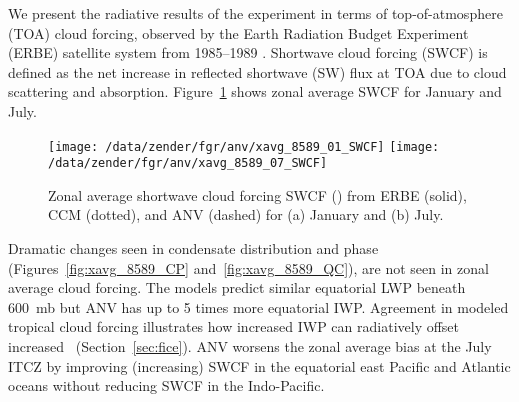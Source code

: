 \documentclass[twoside,agupp]{aguplus}
\begin{document}
We present the radiative results of the experiment in terms of
top-of-atmosphere (TOA) cloud forcing, observed by the Earth Radiation
Budget Experiment (ERBE) satellite system from 1985--1989
\cite[]{HuC92}.
Shortwave cloud forcing (SWCF) is defined as the net increase in
reflected shortwave (SW) flux at TOA due to cloud scattering and
absorption. 
Figure~\ref{fig:xavg_8589_SWCF} shows zonal average SWCF for January
and July. 
\begin{figure}
\begin{center}
\texttt{[image: /data/zender/fgr/anv/xavg\_8589\_01\_SWCF]}\vfill
\texttt{[image: /data/zender/fgr/anv/xavg\_8589\_07\_SWCF]}\vfill
\end{center}
\caption[Zonal average shortwave cloud forcing SWCF from ERBE,
CCM, and ANV for January and July]{ 
Zonal average shortwave cloud forcing SWCF (\wxmS) from ERBE
(solid), CCM (dotted), and ANV (dashed) for (a) January and (b) July.
\label{fig:xavg_8589_SWCF}}   
\end{figure}
Dramatic changes seen in condensate distribution and phase
(Figures~\ref{fig:xavg_8589_CP} and~\ref{fig:xavg_8589_QC}), are not
seen in zonal average cloud forcing.
The models predict similar equatorial LWP beneath 600~mb but ANV has
up to 5 times more equatorial IWP. 
Agreement in modeled tropical cloud forcing illustrates how increased
IWP can radiatively offset increased \rdsffc\ (Section~\ref{sec:fice}).
ANV worsens the zonal average bias at the July ITCZ by improving
(increasing) SWCF in the equatorial east Pacific and Atlantic oceans
without reducing SWCF in the Indo-Pacific.
\end{document}
